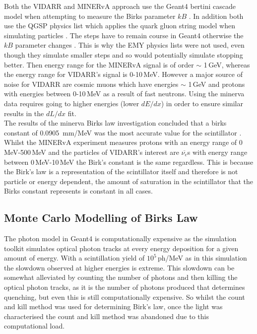 \documentclass[12pt,a4paper]{article}
\begin{document}
Both the VIDARR and MINERvA approach use the Geant4 bertini cascade model when attempting to measure the Birks parameter $kB$ \cite{Geant4_bert_cas}. In addition both use the QGSP physics list which applies the quark gluon string model when simulating particles \cite{Minerva_QGSP}. The steps have to remain course in Geant4 otherwise the $kB$ parameter changes  \cite{minerva_birks}. This is why the EMY physics lists were not used, even though they simulate smaller steps and so would potentially simulate stopping better. Then energy range for the MINERvA signal is of order $\sim$ 1\,GeV, whereas the energy range for VIDARR's signal is 0-10\,MeV. However a major source of noise for VIDARR are cosmic muons which have energies $\sim$ 1\,GeV and protons with energies between 0-10\,MeV as a result of fast neutrons. Using the minerva data requires going to higher energies (lower $dE/dx$) in order to ensure similar results in the $dL/dx$ fit.  \\

The results of the minerva Birks law investigation concluded that a birks constant of 0.0905 \,mm/MeV was the most accurate value for the scintillator \cite{minerva_birks}. Whilst the MINERvA experiment measures protons with an energy range of 0\,MeV-500\,MeV and the particles of VIDARR's interest are $\overline{\nu_{e}}$s with energy range between 0\,MeV-10\,MeV the Birk's constant is the same regardless. This is because the Birk's law is a representation of the scintillator itself and therefore is not particle or energy dependent, the amount of saturation in the scintillator that the Birks constant represents is constant in all cases.

\subsection{Monte Carlo Modelling of Birks Law}
The photon model in Geant4 is computationally expensive as the simulation toolkit simulates optical photon tracks at every energy deposition for a given amount of energy. With a scintillation yield of $10^5$\,ph/MeV as in this simulation the slowdown observed at higher energies is extreme. This slowdown can be somewhat alleviated by counting the number of photons and then killing the optical photon tracks, as it is the number of photons produced that determines quenching, but even this is still computationally expensive. So whilst the count and kill method was used for determining Birk's law, once the light was characterised the count and kill method was abandoned due to this computational load. \\
\end{document}
